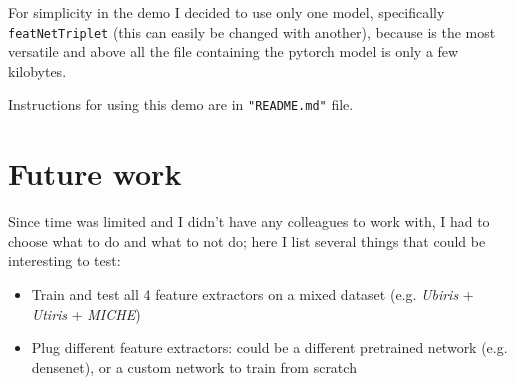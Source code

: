 \documentclass{article}
\begin{document}
For simplicity in the demo I decided to use only one model, specifically \texttt{featNetTriplet} (this can easily be changed with another), because is the most versatile and above all the file containing the pytorch model is only a few kilobytes. 

\bigskip
Instructions for using this demo are in \texttt{"README.md"} file.

\section{Future work}
Since time was limited and I didn't have any colleagues to work with, I had to choose what to do and what to not do; here I list several things that could be interesting to test:
\begin{itemize}
    \item Train and test all 4 feature extractors on a mixed dataset (e.g. \textit{Ubiris} + \textit{Utiris} + \textit{MICHE})
    \item Plug different feature extractors: could be a different pretrained network (e.g. densenet), or a custom network to train from scratch
\end{itemize}
\printbibliography
\end{document}
